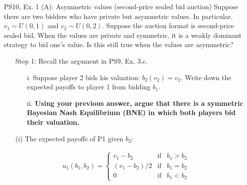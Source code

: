 \begin{frame}{PS10, Ex. 1 (A): Asymmetric values (second-price sealed bid auction)}
    Suppose there are two bidders who have private but asymmetric values. In particular, $v_1\sim U(0, 1)$ and $v_2\sim U(0, 2)$. Suppose the auction format is second-price sealed bid. When the values are private and symmetric, it is a weakly dominant strategy to bid one’s value. Is this still true when the values are asymmetric?
    \begin{multicols}{2}
      \begin{itemize}
        \item[Step 1:] Recall the argument in PS9, Ex. 3.c.
        \begin{itemize}\normalsize
          \item[i.]   Suppose player 2 bids his valuation: $b_2(v_2) = v_2$. Write down the expected payoffs to player 1 from bidding $b_1$.
          \item[ii.]  \textbf{Using your previous answer, argue that there is a symmetric Bayesian Nash Equilibrium (BNE) in which both players bid their valuation.}
        \end{itemize}
      \end{itemize}
      \vfill\null\columnbreak
      \begin{itemize}
        \item[(i)] The expected payoffs of P1 given $b_2$:
      \end{itemize}
      \vspace{-12pt}
      \begin{align*}
        u_1(b_1,b_2)=\left\{\begin{array}{lcl}
          v_1-b_2     & \text{if} & b_1>b_2 \\
          (v_1-b_2)/2 & \text{if} & b_1=b_2 \\
          0           & \text{if} & b_1<b_2
        \end{array}\right.
      \end{align*}
      \vfill\null
    \end{multicols}
\end{frame}

